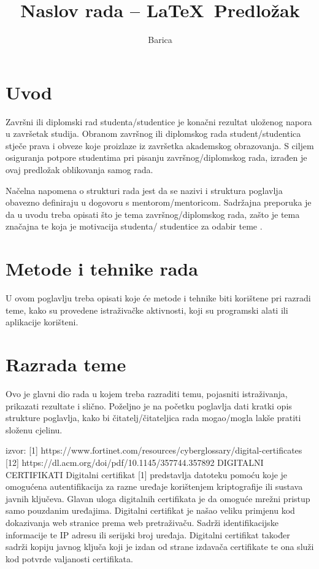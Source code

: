 \documentclass[]{foi}
\title{Naslov rada -- \LaTeX\ Predložak}
\author{Barica}
\begin{document}
\maketitle

\tableofcontents

\makeatletter {} \makeatother
\pagestyle{plain}



\chapter{Uvod}

Završni ili diplomski rad studenta/studentice je konačni rezultat uloženog napora u završetak studija. Obranom završnog ili diplomskog rada student/studentica stječe prava i obveze koje proizlaze iz završetka akademskog obrazovanja. S ciljem osiguranja potpore studentima pri pisanju završnog/diplomskog rada, izrađen je ovaj predložak oblikovanja samog rada.

Načelna napomena o strukturi rada jest da se nazivi i struktura poglavlja obavezno definiraju u dogovoru s mentorom/mentoricom. Sadržajna preporuka je da u uvodu treba opisati što je tema završnog/diplomskog rada, zašto je tema značajna te koja je motivacija studenta/ studentice za odabir teme \cite{oraictolic2011AkademskoPismoStrategije}.



\chapter{Metode i tehnike rada}

U ovom poglavlju treba opisati koje će metode i tehnike biti korištene pri razradi teme, kako su provedene istraživačke aktivnosti, koji su programski alati ili aplikacije korišteni.

\lipsum[1-2]



\chapter{Razrada teme}

Ovo je glavni dio rada u kojem treba razraditi temu, pojasniti istraživanja, prikazati rezultate i slično. Poželjno je na početku poglavlja dati kratki opis strukture poglavlja, kako bi čitatelj/čitateljica rada mogao/mogla lakše pratiti složenu cjelinu.

izvor: [1] https://www.fortinet.com/resources/cyberglossary/digital-certificates
		[12] https://dl.acm.org/doi/pdf/10.1145/357744.357892 
DIGITALNI CERTIFIKATI
Digitalni certifikat [1] predstavlja datoteku pomoću koje je omogućena autentifikacija za razne uređaje korištenjem kriptografije ili sustava javnih ključeva.
Glavan uloga digitalnih certifikata je da omoguće mrežni pristup samo pouzdanim uređajima.
Digitalni certifikat je našao veliku primjenu kod dokazivanja web stranice prema web pretraživaču.
Sadrži identifikacijske informacije te IP adresu ili serijski broj uređaja. 
Digitalni certifikat također sadrži kopiju javnog ključa koji je izdan od strane izdavača certifikate te ona služi kod potvrde valjanosti certifikata.
\end{document}
